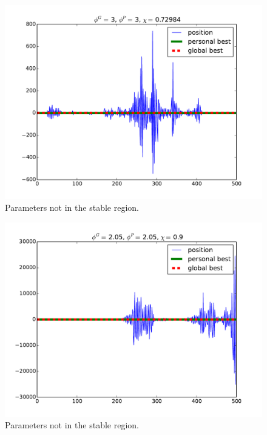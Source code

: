 \begin{figure}
\centering
\includegraphics[width=\linewidth]{./figure/bound_case_2}
\caption{Parameters not in the stable region.}
\label{fig:bound_case:b}
\end{figure}

\begin{figure}
\centering
\includegraphics[width=\linewidth]{./figure/bound_case_3}
\caption{Parameters not in the stable region.}
\label{fig:bound_case:c}
\end{figure}


